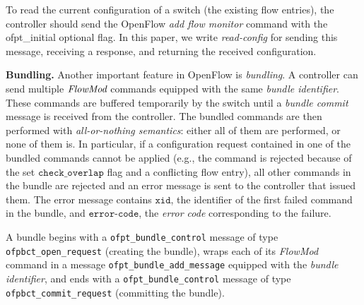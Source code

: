 \documentclass[conference]{sigcomm-alternate}
\newcommand{\hide}[1]{}
\newcommand{\FlowMod}{\emph{FlowMod}\xspace}
\newcommand{\checko}{\texttt{check\_overlap}\xspace}
\newcommand{\stefan}[1]{\textit{\textcolor{red}{[stefan]: #1}}} %
\newcommand{\xid}{\texttt{xid}}
\newcommand{\ecode}{\texttt{error-code}}
\begin{document}
To read the current configuration of a switch (the existing flow entries), the controller should send
the OpenFlow \emph{add flow monitor} command with the \textsf{ofpt\_initial} optional flag.
In this paper, we write \textit{read-config} for sending
this message, receiving a response, and returning the received configuration.

\hide{
We also remark that our solution is only based on flow tables
and does not make use
of \emph{OpenFlow group tables}, nor do we make use of \emph{cookies}: rules
are always identified by exact matches.
}

\vspace{1mm}
\noindent\textbf{Bundling.}
%
Another important feature in OpenFlow is \emph{bundling}. %
A controller can send multiple $\FlowMod$ commands  equipped with
the same \emph{bundle identifier}.
These commands are buffered temporarily by
the switch until a \emph{bundle commit} message is received from the
controller.
The bundled commands are then performed with \emph{all-or-nothing semantics}:
either all of them are performed, or none of them is.
In particular, if a configuration request contained in one of the bundled commands cannot
be applied (e.g., the command is rejected because of the set
$\checko$ flag and a conflicting flow entry), all  other commands in
the bundle are rejected and an error
message is sent to the controller that issued them.
The error message contains $\xid$, the identifier of the first failed command in the
bundle, and $\ecode$, the \emph{error code} corresponding to the failure.

A bundle begins with a  \texttt{ofpt\_bundle\_control} message of type
\texttt{ofpbct\_open\_request} (creating the bundle), wraps
each of its \emph{FlowMod} command in a message
\texttt{ofpt\_bundle\_add\_message} equipped with the \emph{bundle
  identifier}, and ends with a \texttt{ofpt\_bundle\_control} message of
type \texttt{ofpbct\_commit\_request} (committing the bundle).

\end{document}
